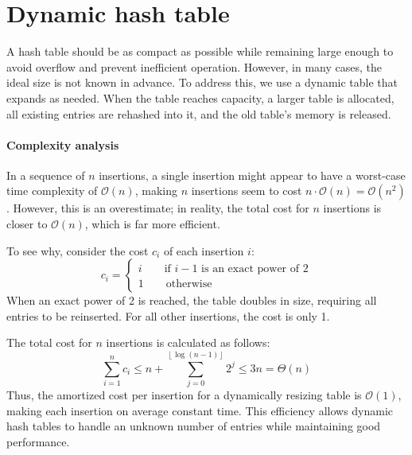\section{Dynamic hash table}

A hash table should be as compact as possible while remaining large enough to avoid overflow and prevent inefficient operation.
However, in many cases, the ideal size is not known in advance.
To address this, we use a dynamic table that expands as needed. 
When the table reaches capacity, a larger table is allocated, all existing entries are rehashed into it, and the old table's memory is released.

\paragraph*{Complexity analysis}
In a sequence of $n$ insertions, a single insertion might appear to have a worst-case time complexity of $\mathcal{O}(n)$, making $n$ insertions seem to cost $n\cdot\mathcal{O}(n)=\mathcal{O}(n^2)$.
However, this is an overestimate; in reality, the total cost for $n$ insertions is closer to $\mathcal{O}(n)$, which is far more efficient.

To see why, consider the cost $c_i$ of each insertion $i$:
\[c_i=\begin{cases}
    i \qquad\text{if }i - 1 \text{ is an exact power of }2 \\
    1 \qquad\text{otherwise}
\end{cases}\]
When an exact power of 2 is reached, the table doubles in size, requiring all entries to be reinserted. 
For all other insertions, the cost is only 1.

The total cost for $n$ insertions is calculated as follows:
\[\sum_{i=1}^nc_i\leq n+\sum_{j=0}^{\left\lfloor \log(n-1)\right\rfloor}2^j\leq 3n=\Theta(n)\]
Thus, the amortized cost per insertion for a dynamically resizing table is $\mathcal{O}(1)$, making each insertion on average constant time. 
This efficiency allows dynamic hash tables to handle an unknown number of entries while maintaining good performance.